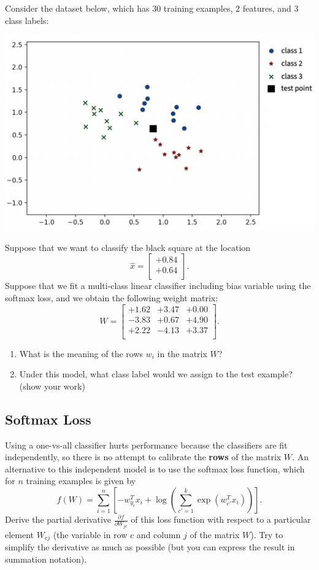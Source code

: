 \documentclass{article}
\def\blu#1{{\color{blu}#1}}
\begin{document}
Consider the dataset below, which has $30$ training examples, $2$ features, and $3$ class labels:\\
\begin{center}\includegraphics[scale=0.3]{a4f/softmaxData.png}\end{center}
Suppose that we want to classify the black square at the location
\[
\hat{x} = \begin{bmatrix}+0.84 \\ +0.64\\ \end{bmatrix}.
\]
Suppose that we fit a multi-class linear classifier including bias variable using the softmax loss, and we obtain the following weight matrix:
\[
W =
\begin{bmatrix}
+1.62 & +3.47 & +0.00\\
-3.83 & +0.67 & +4.90\\
+2.22 & -4.13 & +3.37\\
\end{bmatrix}.
\]
\blu{
\begin{enumerate}
\item What is the meaning of the rows $w_i$ in the matrix $W$?
\item Under this model, what class label would we assign to the test example? (show your work)
\end{enumerate}}



\pagebreak

\subsection{Softmax Loss}

Using a one-vs-all classifier hurts performance because the classifiers are fit independently, so there is no attempt to calibrate the \textbf{rows} of the matrix $W$. An alternative to this independent model is to use the softmax loss function, which for $n$ training examples is given by
\[
f(W) = \sum_{i=1}^n \left[-w_{y_i}^Tx_i + \log\left(\sum_{c' = 1}^k \exp(w_{c'}^Tx_i)\right)\right].
\]
\blu{Derive the partial derivative $\frac{\partial f}{\partial W_{jc}}$ of this loss function with respect to a particular element $W_{cj}$ (the variable in row $c$ and column $j$ of the matrix $W$)}. Try to simplify the derivative as much as possible (but you can express the result in summation notation).
\end{document}
